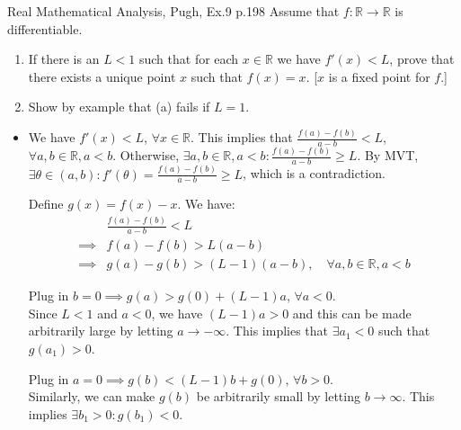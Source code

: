 \begin{problem}{}{}{Real Mathematical Analysis, Pugh, Ex.9 p.198}
Assume that $f : \mathbb{R} \to \mathbb{R}$ is differentiable.
\begin{enumerate}
    \item[(a)] If there is an $L < 1$ such that for each $x \in \mathbb{R}$ we have $f'(x) < L$, prove that there exists a unique point $x$ such that $f(x) = x$. [$x$ is a fixed point for $f$.]
    \item[(b)] Show by example that (a) fails if $L = 1$.
\end{enumerate}
\end{problem}

\begin{solution}
    \begin{itemize}
        \item[(a)]
              We have $f'(x) < L$, $\forall x \in \mathbb{R}$.
              This implies that $\frac{f(a) - f(b)}{a - b} < L$, $\forall a,b \in \mathbb{R}, a < b$.
              Otherwise, $\exists a, b \in \mathbb{R}, a < b : \frac{f(a) - f(b)}{a - b} \ge L$.
              By MVT, $\exists \theta \in (a, b) : f'(\theta) = \frac{f(a) - f(b)}{a - b} \ge L$,
              which is a contradiction.

              Define $g(x) = f(x) - x$. We have:
              \begin{align*}
                           & \frac{f(a) - f(b)}{a - b} < L                                         \\
                  \implies & f(a) - f(b) > L(a - b)                                                \\
                  \implies & g(a) - g(b) > (L - 1)(a - b), \quad \forall a,b \in \mathbb{R}, a < b
              \end{align*}

              Plug in $b = 0 \implies g(a) > g(0) + (L - 1)a$, $\forall a < 0$. \\
              Since $L < 1$ and $a < 0$, we have $(L - 1)a > 0$ and this can be made
              arbitrarily large by letting $a \to -\infty$.
              This implies that $\exists a_1 < 0$ such that $g(a_1) > 0$.

              Plug in $a = 0 \implies g(b) < (L - 1)b + g(0)$, $\forall b > 0$. \\
              Similarly, we can make $g(b)$ be arbitrarily small by letting $b \to \infty$.
              This implies $\exists b_1 > 0 : g(b_1) < 0$.


\end{itemize}
\end{solution}
